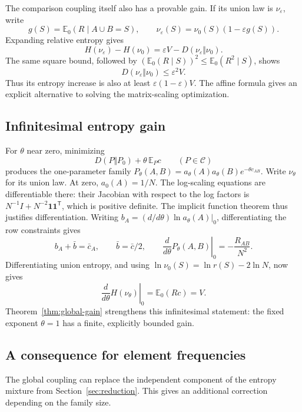 \documentclass[11pt]{article}
\theoremstyle{remark}
\begin{document}
The comparison coupling itself also has a provable gain. If its union
law is \(\nu_\varepsilon\), write
\[
g(S)=\mathbb E_0(R\mid A\cup B=S),\qquad
\nu_\varepsilon(S)=\nu_0(S)(1-\varepsilon g(S)).
\]
Expanding relative entropy gives
\[
H(\nu_\varepsilon)-H(\nu_0)
=\varepsilon V-D(\nu_\varepsilon\Vert \nu_0).
\]
The same square bound, followed by
\((\mathbb E_0(R\mid S))^2\le\mathbb E_0(R^2\mid S)\), shows
\[
D(\nu_\varepsilon\Vert \nu_0)\le\varepsilon^2V.
\]
Thus its entropy increase is also at least
\(\varepsilon(1-\varepsilon)V\).
The affine formula gives an explicit alternative to solving the
matrix-scaling optimization.

\subsection{Infinitesimal entropy gain}
For \(\theta\) near zero, minimizing
\[
D(P\Vert P_0)+\theta\,\mathbb E_Pc
\qquad(P\in\mathcal C)
\]
produces the one-parameter family
\(P_\theta(A,B)=a_\theta(A)a_\theta(B)e^{-\theta c_{AB}}\).
Write \(\nu_\theta\) for its union law. At zero, \(a_0(A)=1/N\).
The log-scaling equations are differentiable there: their Jacobian
with respect to the log factors is
\(N^{-1}I+N^{-2}\mathbf1\mathbf1^{\mathsf T}\), which is positive
definite. The implicit function theorem thus justifies differentiation.
Writing \(b_A=(d/d\theta)\ln a_\theta(A)|_0\), differentiating the
row constraints gives
\[
b_A+\bar b=\bar c_A,\qquad
\bar b=\bar c/2,\qquad
\left.\frac{d}{d\theta}P_\theta(A,B)\right|_0=-\frac{R_{AB}}{N^2}.
\]
Differentiating union entropy, and using
\(\ln \nu_0(S)=\ln r(S)-2\ln N\), now gives
\[
\left.\frac{d}{d\theta}H(\nu_\theta)\right|_0
=\mathbb E_0(Rc)=V.
\]
Theorem~\ref{thm:global-gain} strengthens this infinitesimal statement:
the fixed exponent \(\theta=1\) has a finite, explicitly bounded gain.

\subsection{A consequence for element frequencies}
The global coupling can replace the independent component of the
entropy mixture from Section~\ref{sec:reduction}. This gives an additional correction depending
on the family size.
\end{document}

